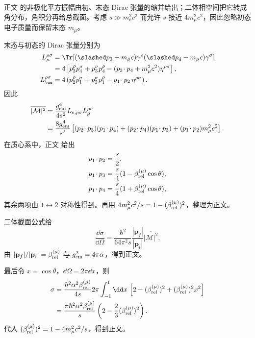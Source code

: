 \begin{derivation}[电子湮灭产生缪子对的总截面]

正文 的非极化平方振幅由初、末态 Dirac 张量的缩并给出；二体相空间把它转成角分布，角积分再给总截面。考虑 $s\gg m_{\mathrm e}^2c^2$ 而允许 $s$ 接近 $4m_\mu^2c^2$，因此忽略初态电子质量而保留末态 $m_\mu$。

末态与初态的 Dirac 张量分别为
\begin{align*}
 L_{\mu}^{\rho\sigma}
 &=\Tr[(\slashed p_3+m_\mu c)\gamma^\rho
 (\slashed p_4-m_\mu c)\gamma^\sigma]\\
 &=4\left[
 p_3^\rho p_4^\sigma+p_3^\sigma p_4^\rho
 -(p_3\!\cdot p_4+m_\mu^2c^2)\eta^{\rho\sigma}
 \right],\\
 L_\ee^{\rho\sigma}
 &=4\left(
 p_2^\rho p_1^\sigma+p_2^\sigma p_1^\rho
 -p_1\!\cdot p_2\,\eta^{\rho\sigma}
 \right).
\end{align*}
因此
\begin{align*}
 \overline{|\mathcal M|^2}
 &=\frac{g_{\rm em}^4}{4s^2}L_{e,\rho\sigma}L_\mu^{\rho\sigma}\\
 &=\frac{8g_{\rm em}^4}{s^2}
 \left[
 (p_2\!\cdot p_3)(p_1\!\cdot p_4)
 +(p_2\!\cdot p_4)(p_1\!\cdot p_3)
 +(p_1\!\cdot p_2)m_\mu^2c^2
 \right].
\end{align*}
在质心系中，正文 给出
\begin{align*}
 p_1\!\cdot p_2&=\frac{s}{2},\\
 p_1\!\cdot p_3&=\frac{s}{4}
 (1-\beta_{\rm rel}^{(\mu)}\cos\theta),\\
 p_1\!\cdot p_4&=\frac{s}{4}
 (1+\beta_{\rm rel}^{(\mu)}\cos\theta),
\end{align*}
其余两项由 $1\leftrightarrow2$ 对称性得到。再用
$4m_\mu^2c^2/s=1-(\beta_{\rm rel}^{(\mu)})^2$，整理为正文。

二体截面公式给
\begin{equation*}
 \frac{\dd\sigma}{\dd\Omega}
 =\frac{\hbar^2}{64\pi^2s}
 \frac{|\mathbf p_f|}{|\mathbf p_i|}
 \overline{|\mathcal M|^2}.
\end{equation*}
由 $|\mathbf p_f|/|\mathbf p_i|=\beta_{\rm rel}^{(\mu)}$ 与
$g_{\rm em}^2=4\pi\alpha$，得到正文。

最后令 $x=\cos\theta$，$\dd\Omega=2\pi\dd x$，则
\begin{align*}
 \sigma
 &=\frac{\hbar^2\alpha^2\beta_{\rm rel}^{(\mu)}}{4s}
 2\pi\int_{-1}^{1}\dd x\,
 \left[2-(\beta_{\rm rel}^{(\mu)})^2
 +(\beta_{\rm rel}^{(\mu)})^2x^2\right]\\
 &=\frac{\pi\hbar^2\alpha^2\beta_{\rm rel}^{(\mu)}}{s}
 \left(2-\frac{2}{3}(\beta_{\rm rel}^{(\mu)})^2\right).
\end{align*}
代入
$(\beta_{\rm rel}^{(\mu)})^2=1-4m_\mu^2c^2/s$，得到正文。
\end{derivation}

